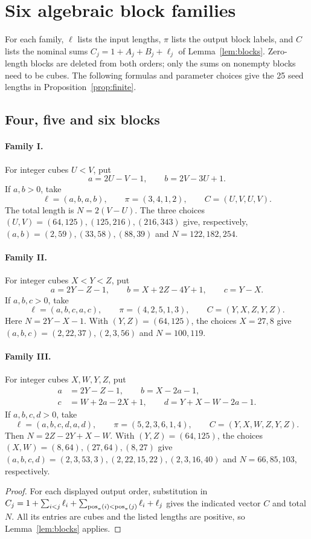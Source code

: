 \section{Six algebraic block families}\label{app:families}
For each family, $\ell$ lists the input lengths, $\pi$ lists the output
block labels, and $C$ lists the nominal sums
$C_j=1+A_j+B_j+\ell_j$ of Lemma~\ref{lem:blocks}.
Zero-length blocks are deleted from both orders; only the sums on
nonempty blocks need to be cubes. The following formulas and parameter
choices give the 25 seed lengths in Proposition~\ref{prop:finite}.

\subsection{Four, five and six blocks}
\paragraph{Family I.}
For integer cubes $U<V$, put
\[
a=2U-V-1,\qquad b=2V-3U+1.
\]
If $a,b>0$, take
\[
\ell=(a,b,a,b),\qquad \pi=(3,4,1,2),\qquad C=(U,V,U,V).
\]
The total length is $N=2(V-U)$. The three choices
$(U,V)=(64,125),(125,216),(216,343)$ give, respectively,
$(a,b)=(2,59),(33,58),(88,39)$ and $N=122,182,254$.

\paragraph{Family II.}
For integer cubes $X<Y<Z$, put
\[
a=2Y-Z-1,\qquad b=X+2Z-4Y+1,\qquad c=Y-X.
\]
If $a,b,c>0$, take
\[
\ell=(a,b,c,a,c),\qquad \pi=(4,2,5,1,3),\qquad C=(Y,X,Z,Y,Z).
\]
Here $N=2Y-X-1$. With $(Y,Z)=(64,125)$, the choices $X=27,8$
give $(a,b,c)=(2,22,37),(2,3,56)$ and $N=100,119$.

\paragraph{Family III.}
For integer cubes $X,W,Y,Z$, put
\[
\begin{split}
a&=2Y-Z-1,\qquad b=X-2a-1,\\
c&=W+2a-2X+1,\qquad d=Y+X-W-2a-1.
\end{split}
\]
If $a,b,c,d>0$, take
\[
\ell=(a,b,c,d,a,d),\qquad \pi=(5,2,3,6,1,4),\qquad C=(Y,X,W,Z,Y,Z).
\]
Then $N=2Z-2Y+X-W$. With $(Y,Z)=(64,125)$, the choices
$(X,W)=(8,64),(27,64),(8,27)$ give
$(a,b,c,d)=(2,3,53,3),(2,22,15,22),(2,3,16,40)$ and
$N=66,85,103$, respectively.

\begin{proof}
For each displayed output order, substitution in
$C_j=1+\sum_{i<j}\ell_i+
\sum_{\operatorname{pos}_\pi(i)<\operatorname{pos}_\pi(j)}\ell_i+\ell_j$
gives the indicated vector $C$ and total $N$.
All its entries are cubes and the listed lengths are positive, so
Lemma~\ref{lem:blocks} applies.
\end{proof}

